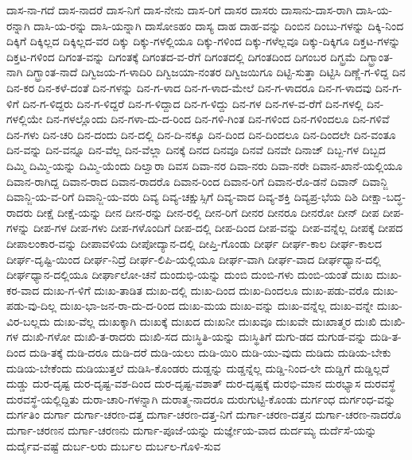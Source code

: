 {ದಾಸ-ನಾ-ಗದೆ
ದಾಸ-ನಾದರೆ
ದಾಸ-ನಿಗೆ
ದಾಸ-ನೇನು
ದಾಸ-ರಿಗೆ
ದಾಸರ
ದಾಸರು
ದಾಸಾನು-ದಾಸ-ರಾಗಿ
ದಾಸಿ-ಯ-ರನ್ನಾಗಿ
ದಾಸಿ-ಯ-ರನ್ನು
ದಾಸಿ-ಯನ್ನಾಗಿ
ದಾಸೋಽಹಂ
ದಾಸ್ಯ
ದಾಹ
ದಾಹ-ವನ್ನು
ದಿಂಬಿನ
ದಿಂಬು-ಗಳನ್ನು
ದಿಕ್ಕಿ-ನಿಂದ
ದಿಕ್ಕಿಗೆ
ದಿಕ್ಕಿಲ್ಲದ
ದಿಕ್ಕಿಲ್ಲದ-ವರ
ದಿಕ್ಕು
ದಿಕ್ಕು-ಗಳಲ್ಲಿಯೂ
ದಿಕ್ಕು-ಗಳಿಂದ
ದಿಕ್ಕು-ಗಳೆಲ್ಲವೂ
ದಿಕ್ಕು-ದಿಕ್ಕಿಗೂ
ದಿಕ್ತಟ-ಗಳನ್ನು
ದಿಕ್ತಟ-ಗಳಿಂದ
ದಿಗಂತ-ವನ್ನು
ದಿಗಂತಕ್ಕೆ
ದಿಗಂತದ-ವ-ರೆಗೆ
ದಿಗಂತದಲ್ಲಿ
ದಿಗಂತದಿಂದ
ದಿಗಂಬರ
ದಿಗ್ಭ್ರಮೆ
ದಿಗ್ಭ್ರಾಂತ-ನಾಗಿ
ದಿಗ್ಭ್ರಾಂತ-ನಾದೆ
ದಿಗ್ವಿಜಯ-ಗ-ಳಾದಿರಿ
ದಿಗ್ವಿಜಯಾ-ನಂತರ
ದಿಗ್ವಿಜಯಿಗೂ
ದಿಟ್ಟಿ-ಸುತ್ತಾ
ದಿಟ್ಟಿಸಿ
ದಿಣ್ಣೆ-ಗ-ಳಿದ್ದ
ದಿನ
ದಿನ-ಕರ
ದಿನ-ಕಳೆ-ದಂತೆ
ದಿನ-ಗಳನ್ನು
ದಿನ-ಗ-ಳಾದ
ದಿನ-ಗ-ಳಾದ-ಮೇಲೆ
ದಿನ-ಗ-ಳಾದರೂ
ದಿನ-ಗ-ಳಾದವು
ದಿನ-ಗ-ಳಿಗೆ
ದಿನ-ಗ-ಳಿದ್ದರು
ದಿನ-ಗ-ಳಿದ್ದರೆ
ದಿನ-ಗ-ಳಿದ್ದಾದ
ದಿನ-ಗ-ಳಿದ್ದು
ದಿನ-ಗಳ
ದಿನ-ಗಳ-ವ-ರೆಗೆ
ದಿನ-ಗಳಲ್ಲಿ
ದಿನ-ಗಳಲ್ಲಿಯೇ
ದಿನ-ಗಳಲ್ಲೊಂದು
ದಿನ-ಗಳಾ-ದು-ದ-ರಿಂದ
ದಿನ-ಗಳಿ-ಗಿಂತ
ದಿನ-ಗಳಿಂದ
ದಿನ-ಗಳಿಂದಲೂ
ದಿನ-ಗಳಿವೆ
ದಿನ-ಗಳು
ದಿನ-ಚರಿ
ದಿನ-ದಂದು
ದಿನ-ದಲ್ಲಿ
ದಿನ-ದಿ-ನಕ್ಕೂ
ದಿನ-ದಿಂದ
ದಿನ-ದಿಂದಲೂ
ದಿನ-ದಿಂದಲೇ
ದಿನ-ವಂತೂ
ದಿನ-ವನ್ನು
ದಿನ-ವನ್ನೂ
ದಿನ-ವೆಲ್ಲ
ದಿನ-ವೆಲ್ಲಾ
ದಿನಕ್ಕೆ
ದಿನದ
ದಿನವೂ
ದಿನವೆ
ದಿನವೇ
ದಿನಾಜ್
ದಿಬ್ಬ-ಗಳ
ದಿಬ್ಬದ
ದಿಮ್ಮಿ
ದಿಮ್ಮಿ-ಯನ್ನು
ದಿಮ್ಮಿ-ಯೆಂದು
ದಿಲ್ವಾರಾ
ದಿವಸ
ದಿವಾ-ನರ
ದಿವಾ-ನರು
ದಿವಾ-ನರೇ
ದಿವಾನ-ಖಾನೆ-ಯಲ್ಲಿಯೂ
ದಿವಾನ-ರಾಗಿದ್ದ
ದಿವಾನ-ರಾದ
ದಿವಾನ-ರಾದರೊ
ದಿವಾನ-ರಿಂದ
ದಿವಾನ-ರಿಗೆ
ದಿವಾನ-ರೊ-ಡನೆ
ದಿವಾನ್
ದಿವಾನ್ಜಿ
ದಿವಾನ್ಜಿ-ಯ-ವ-ರಿಗೆ
ದಿವಾನ್ಜಿ-ಯ-ವರು
ದಿವ್ಯ
ದಿವ್ಯ-ಚಕ್ಷುಸ್ಸಿಗೆ
ದಿವ್ಯ-ವಾದ
ದಿವ್ಯ-ಶಕ್ತಿ
ದಿವ್ಯಪ್ರ-ಭೆಯ
ದಿಶಿ
ದೀಕ್ಷಾ-ಬದ್ಧ-ರಾದರು
ದೀಕ್ಷೆ
ದೀಕ್ಷೆ-ಯನ್ನು
ದೀನ
ದೀನ-ರನ್ನು
ದೀನ-ರಲ್ಲಿ
ದೀನ-ರಿಗೆ
ದೀನರ
ದೀನರೂ
ದೀನರೋ
ದೀನ್
ದೀಪ
ದೀಪ-ಗಳನ್ನು
ದೀಪ-ಗಳ
ದೀಪ-ಗಳು
ದೀಪ-ಗಳೊಂದಿಗೆ
ದೀಪ-ದಲ್ಲಿ
ದೀಪ-ದಿಂದ
ದೀಪ-ವನ್ನು
ದೀಪ-ವನ್ನೆಲ್ಲ
ದೀಪಕ್ಕೆ
ದೀಪದ
ದೀಪಾಲಂಕಾರ-ವನ್ನು
ದೀಪಾವಳಿಯ
ದೀಪೋದ್ಯಾನ-ದಲ್ಲಿ
ದೀಪ್ತಿ-ಗೊಂಡು
ದೀರ್ಘ
ದೀರ್ಘ-ಕಾಲ
ದೀರ್ಘ-ಕಾಲದ
ದೀರ್ಘ-ದೃಷ್ಟಿ-ಯಿಂದ
ದೀರ್ಘ-ನಿದ್ರೆ
ದೀರ್ಘ-ಲಿಪಿ-ಯಲ್ಲಿಯೂ
ದೀರ್ಘ-ವಾಗಿ
ದೀರ್ಘ-ವಾದ
ದೀರ್ಘಧ್ಯಾನ-ದಲ್ಲಿ
ದೀರ್ಘಧ್ಯಾನ-ದಲ್ಲಿಯೂ
ದೀರ್ಘಾಲೋ-ಚನೆ
ದುಂದುಭಿ-ಯನ್ನು
ದುಂಬಿ
ದುಂಬಿ-ಗಳು
ದುಂಬಿ-ಯಂತೆ
ದುಃಖ
ದುಃಖ-ಕರ-ವಾದ
ದುಃಖ-ಗ-ಳಿಗೆ
ದುಃಖ-ತಾಡಿತ
ದುಃಖ-ದಲ್ಲಿ
ದುಃಖ-ದಿಂದ
ದುಃಖ-ದಿಂದಲೂ
ದುಃಖ-ಪಡು-ವರೊ
ದುಃಖ-ಪಡು-ವು-ದಿಲ್ಲ
ದುಃಖ-ಭಾ-ಜನ-ರಾ-ದು-ದ-ರಿಂದ
ದುಃಖ-ಮಯ
ದುಃಖ-ವನ್ನು
ದುಃಖ-ವನ್ನೆಲ್ಲ
ದುಃಖ-ವನ್ನೇ
ದುಃಖ-ವಿರ-ಬಲ್ಲದು
ದುಃಖ-ವೆಲ್ಲ
ದುಃಖಕ್ಕಾಗಿ
ದುಃಖಕ್ಕೆ
ದುಃಖದ
ದುಃಖನೀ
ದುಃಖವೂ
ದುಃಖವೇ
ದುಃಖಾತ್ಮರ
ದುಃಖಿ
ದುಃಖಿ-ಗಳ
ದುಃಖಿ-ಗಳೋ
ದುಃಖಿ-ತ-ರಾದರು
ದುಃಖಿ-ಸದ
ದುಃಸ್ಥಿತಿ-ಯನ್ನು
ದುಃಸ್ಥಿತಿಗೆ
ದುಗು-ಡದ
ದುಗುಡ-ವನ್ನು
ದುಡಿ-ತ-ದಿಂದ
ದುಡಿ-ತಕ್ಕೆ
ದುಡಿ-ದರೂ
ದುಡಿ-ದರೆ
ದುಡಿ-ಯಲು
ದುಡಿ-ಯಿರಿ
ದುಡಿ-ಯು-ವುದು
ದುಡಿದು
ದುಡಿಯ-ಬೇಕು
ದುಡಿಯ-ಬೇಕೆಂದು
ದುಡಿಯುತ್ತಲೆ
ದುಡಿಸಿ-ಕೊಂಡರು
ದುಡ್ಡನ್ನು
ದುಡ್ಡನ್ನೆಲ್ಲ
ದುಡ್ಡಿ-ನಿಂದ-ಲೇ
ದುಡ್ಡಿಗೆ
ದುಡ್ಡಿಲ್ಲದೆ
ದುಡ್ಡು
ದುರ-ದೃಷ್ಟ
ದುರ-ದೃಷ್ಟ-ವಶ-ದಿಂದ
ದುರ-ದೃಷ್ಟ-ವಶಾತ್
ದುರ-ದೃಷ್ಟಕ್ಕೆ
ದುರಭಿ-ಮಾನ
ದುರಭ್ಯಾಸ
ದುರವಸ್ಥೆ
ದುರವಸ್ಥೆ-ಯಲ್ಲಿದ್ದಿತು
ದುರಾ-ಚಾರಿ-ಗಳನ್ನಾಗಿ
ದುರಾತ್ಮ-ನಾದರೂ
ದುರುಗುಟ್ಟಿ-ಕೊಂಡು
ದುರ್ಗಂಧ
ದುರ್ಗಂಧ-ವನ್ನು
ದುರ್ಗತಿಂ
ದುರ್ಗಾ
ದುರ್ಗಾ-ಚರಣ-ದತ್ತ
ದುರ್ಗಾ-ಚರಣ-ದತ್ತ-ನಿಗೆ
ದುರ್ಗಾ-ಚರಣ-ದತ್ತನ
ದುರ್ಗಾ-ಚರಣ-ನಾದರೊ
ದುರ್ಗಾ-ಚರಣನ
ದುರ್ಗಾ-ಚರಣನು
ದುರ್ಗಾ-ಪೂಜೆ-ಯನ್ನು
ದುರ್ಜ್ಞೇಯ-ವಾದ
ದುರ್ದಮ್ಯ
ದುರ್ದೆಸೆ-ಯನ್ನು
ದುರ್ದೈವ-ವಷ್ಟೆ
ದುರ್ಬ-ಲರು
ದುರ್ಬಲ
ದುರ್ಬಲ-ಗೊಳಿ-ಸುವ
}
